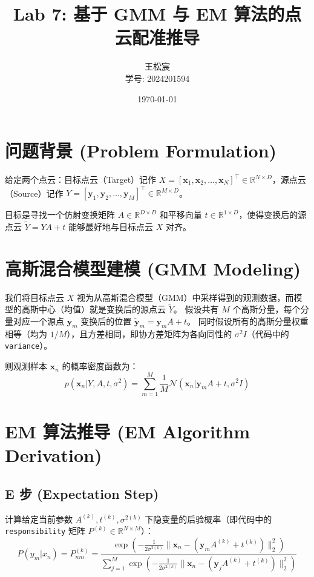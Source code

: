 \documentclass{article}
\title{Lab 7: 基于 GMM 与 EM 算法的点云配准推导}
\author{王松宸 \\ 学号: 2024201594}
\date{\today}
\begin{document}
\maketitle

\section{问题背景 (Problem Formulation)}
给定两个点云：目标点云（Target）记作 $X = [\bm{x}_1, \bm{x}_2, \ldots, \bm{x}_N]^\top \in \mathbb{R}^{N \times D}$，源点云（Source）记作 $Y = [\bm{y}_1, \bm{y}_2, \ldots, \bm{y}_M]^\top \in \mathbb{R}^{M \times D}$。

目标是寻找一个仿射变换矩阵 $A \in \mathbb{R}^{D \times D}$ 和平移向量 $t \in \mathbb{R}^{1 \times D}$，使得变换后的源点云 $\tilde{Y} = Y A + t$ 能够最好地与目标点云 $X$ 对齐。

\section{高斯混合模型建模 (GMM Modeling)}
我们将目标点云 $X$ 视为从高斯混合模型（GMM）中采样得到的观测数据，而模型的高斯中心（均值）就是变换后的源点云 $\tilde{Y}$。
假设共有 $M$ 个高斯分量，每个分量对应一个源点 $\bm{y}_m$ 变换后的位置 $\tilde{\bm{y}}_m = \bm{y}_m A + t$。
同时假设所有的高斯分量权重相等（均为 $1/M$），且方差相同，即协方差矩阵为各向同性的 $\sigma^2 I$（代码中的 \texttt{variance}）。

则观测样本 $\bm{x}_n$ 的概率密度函数为：
\begin{equation}
    p(\bm{x}_n | Y, A, t, \sigma^2) = \sum_{m=1}^{M} \frac{1}{M} \mathcal{N}(\bm{x}_n | \bm{y}_m A + t, \sigma^2 I)
\end{equation}

\section{EM 算法推导 (EM Algorithm Derivation)}

\subsection{E 步 (Expectation Step)}
计算给定当前参数 $A^{(k)}, t^{(k)}, \sigma^{2(k)}$ 下隐变量的后验概率（即代码中的 \texttt{responsibility} 矩阵 $P^{(k)} \in \mathbb{R}^{N \times M}$）：
\begin{equation}
    P(y_m | x_n)=P_{nm}^{(k)} = \frac{\exp \left( -\frac{1}{2\sigma^{2(k)}} \| \bm{x}_n - (\bm{y}_m A^{(k)} + t^{(k)}) \|_2^2 \right)}{\sum_{j=1}^{M} \exp \left( -\frac{1}{2\sigma^{2(k)}} \| \bm{x}_n - (\bm{y}_j A^{(k)} + t^{(k)}) \|_2^2 \right)}
\end{equation}
\end{document}
